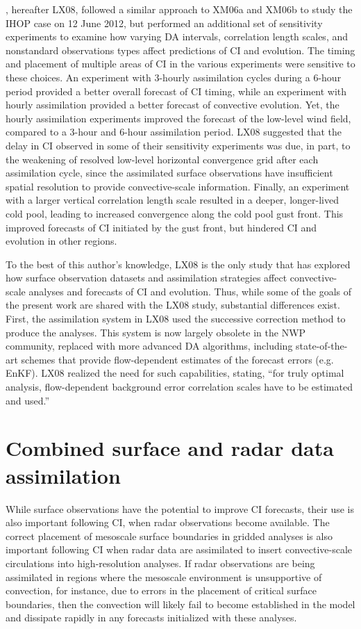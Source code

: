 \citet{liuxue08}, hereafter LX08, followed a similar approach to XM06a and XM06b to study the IHOP case on 12 June 2012, but performed an additional set of sensitivity experiments to examine how varying DA intervals, correlation length scales, and nonstandard observations types affect predictions of CI and evolution. The timing and placement of multiple areas of CI in the various experiments were sensitive to these choices. An experiment with 3-hourly assimilation cycles during a 6-hour period provided a better overall forecast of CI timing, while an experiment with hourly assimilation provided a better forecast of convective evolution. Yet, the hourly assimilation experiments improved the forecast of the low-level wind field, compared to a 3-hour and 6-hour assimilation period. LX08 suggested that the delay in CI observed in some of their sensitivity experiments was due, in part, to the weakening of resolved low-level horizontal convergence grid after each assimilation cycle, since the assimilated surface observations have insufficient spatial resolution to provide convective-scale information. Finally, an experiment with a larger vertical correlation length scale resulted in a deeper, longer-lived cold pool, leading to increased convergence along the cold pool gust front. This improved forecasts of CI initiated by the gust front, but hindered CI and evolution in other regions. 

To the best of this author’s knowledge, LX08 is the only study that has explored how surface observation datasets and assimilation strategies affect convective-scale analyses and forecasts of CI and evolution. Thus, while some of the goals of the present work are shared with the LX08 study, substantial differences exist. First, the assimilation system in LX08 used the \citet{bratseth86} successive correction method to produce the analyses. This system is now largely obsolete in the NWP community, replaced with more advanced DA algorithms, including state-of-the-art schemes that provide flow-dependent estimates of the forecast errors (e.g. EnKF). LX08 realized the need for such capabilities, stating, “for truly optimal analysis, flow-dependent background error correlation scales have to be estimated and used.” 

\section{Combined surface and radar data assimilation}
While surface observations have the potential to improve CI forecasts, their use is also important following CI, when radar observations become available. The correct placement of mesoscale surface boundaries in gridded analyses is also important following CI when radar data are assimilated to insert convective-scale circulations into high-resolution analyses. If radar observations are being assimilated in regions where the mesoscale environment is unsupportive of convection, for instance, due to errors in the placement of critical surface boundaries, then the convection will likely fail to become established in the model and dissipate rapidly in any forecasts initialized with these analyses.

